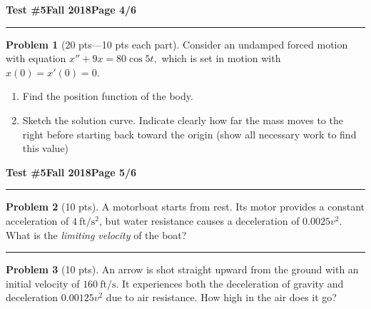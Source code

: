 \documentclass[12pt]{article}
\theoremstyle{definition}
\newtheorem{problem}{Problem}
\begin{document}
\hfill{\large\bf Test \#5}\hfill{\large\bf Fall 2018}\hfill{\large\bf Page 4/6}\hrule

\bigskip
\begin{problem}[20 pts---10 pts each part]
  Consider an undamped forced motion with equation $x''+9x=80\cos 5t,$ which is set in motion with $x(0)=x'(0)=0$.
  \begin{enumerate}
  \item Find the position function of the body.
    \vspace{4cm}
    \begin{flushright}
    \end{flushright}
  \item Sketch the solution curve.  Indicate clearly how far the mass moves to the right before starting back toward the
    origin (show all necessary work to find this value)
  \end{enumerate}  
\end{problem}
\newpage

\hfill{\large\bf Test \#5}\hfill{\large\bf Fall 2018}\hfill{\large\bf Page 5/6}\hrule

\bigskip
\begin{problem}[10 pts]
  A motorboat starts from rest.  Its motor provides a constant acceleration of $4~\mathrm{ft}/\mathrm{s}^2$, but water
  resistance causes a deceleration of $0.0025v^2$.  What is the \emph{limiting velocity} of the boat?
  \vspace{5cm}
  \begin{flushright}
  \end{flushright}
\end{problem}

\hrule
\begin{problem}[10 pts]
  An arrow is shot straight upward from the ground with an initial velocity of $160~\mathrm{ft}/\mathrm{s}$.  It
  experiences both the deceleration of gravity and deceleration $0.00125v^2$ due to air resistance.  How high in the air
  does it go?
  \vspace{10cm}
  \begin{flushright}
  \end{flushright}
\end{problem}
\newpage
\end{document}
